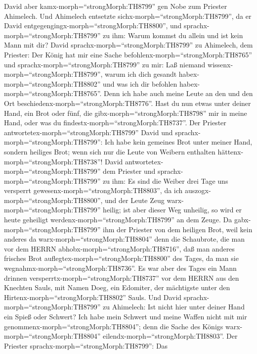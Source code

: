  David aber kamx-morph=``strongMorph:TH8799'' gen Nobe zum
Priester Ahimelech. Und Ahimelech entsetzte
sichx-morph=``strongMorph:TH8799'', da er David
entgegengingx-morph=``strongMorph:TH8800'', und
sprachx-morph=``strongMorph:TH8799'' zu ihm: Warum kommst du allein und
ist kein Mann mit dir?  David
sprachx-morph=``strongMorph:TH8799'' zu Ahimelech, dem Priester: Der
König hat mir eine Sache befohlenx-morph=``strongMorph:TH8765'' und
sprachx-morph=``strongMorph:TH8799'' zu mir: Laß niemand
wissenx-morph=``strongMorph:TH8799'', warum ich dich gesandt
habex-morph=``strongMorph:TH8802'' und was ich dir befohlen
habex-morph=``strongMorph:TH8765''. Denn ich habe auch meine Leute an
den und den Ort beschiedenx-morph=``strongMorph:TH8776''. 
Hast du nun etwas unter deiner Hand, ein Brot oder fünf, die
gibx-morph=``strongMorph:TH8798'' mir in meine Hand, oder was du
findestx-morph=``strongMorph:TH8737''.  Der Priester
antwortetex-morph=``strongMorph:TH8799'' David und
sprachx-morph=``strongMorph:TH8799'': Ich habe kein gemeines Brot unter
meiner Hand, sondern heiliges Brot; wenn sich nur die Leute von Weibern
enthalten hättenx-morph=``strongMorph:TH8738''!  David
antwortetex-morph=``strongMorph:TH8799'' dem Priester und
sprachx-morph=``strongMorph:TH8799'' zu ihm: Es sind die Weiber drei
Tage uns versperrt gewesenx-morph=``strongMorph:TH8803'', da ich
auszogx-morph=``strongMorph:TH8800'', und der Leute Zeug
warx-morph=``strongMorph:TH8799'' heilig; ist aber dieser Weg unheilig,
so wird er heute geheiligt werdenx-morph=``strongMorph:TH8799'' an dem
Zeuge.  Da gabx-morph=``strongMorph:TH8799'' ihm der
Priester von dem heiligen Brot, weil kein anderes da
warx-morph=``strongMorph:TH8804'' denn die Schaubrote, die man vor dem
HERRN abhobx-morph=``strongMorph:TH8716'', daß man anderes frisches Brot
auflegtex-morph=``strongMorph:TH8800'' des Tages, da man sie
wegnahmx-morph=``strongMorph:TH8736''.  Es war aber des
Tages ein Mann drinnen versperrtx-morph=``strongMorph:TH8737'' vor dem
HERRN aus den Knechten Sauls, mit Namen Doeg, ein Edomiter, der
mächtigste unter den Hirtenx-morph=``strongMorph:TH8802'' Sauls.
 Und David sprachx-morph=``strongMorph:TH8799'' zu
Ahimelech: Ist nicht hier unter deiner Hand ein Spieß oder Schwert? Ich
habe mein Schwert und meine Waffen nicht mit mir
genommenx-morph=``strongMorph:TH8804''; denn die Sache des Königs
warx-morph=``strongMorph:TH8804'' eilendx-morph=``strongMorph:TH8803''.
 Der Priester sprachx-morph=``strongMorph:TH8799'': Das

